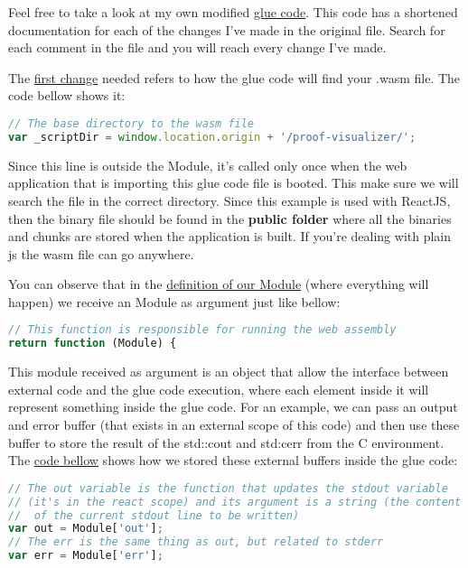 \documentclass[12pt, a4paper]{article}
\begin{document}
Feel free to take a look at my own modified \href{https://github.com/ufmg-smite/proof-visualizer/blob/main/frontend/src/wasm/cvc5.js}{glue code}. This code has a shortened documentation for each of the changes I've made in the original file. Search for each comment in the file and you will reach every change I've made.

The \href{https://github.com/ufmg-smite/proof-visualizer/blob/main/frontend/src/wasm/cvc5.js#L43}{first change} needed refers to how the glue code will find your .wasm file. The code bellow shows it:

\begin{lstlisting}[language=JavaScript]
// The base directory to the wasm file
var _scriptDir = window.location.origin + '/proof-visualizer/';
\end{lstlisting}

Since this line is outside the Module, it's called only once when the web application that is importing this glue code file is booted. This make sure we will search the file in the correct directory. Since this example is used with ReactJS, then the binary file should be found in the \textbf{public folder} where all the binaries and chunks are stored when the application is built. If you're dealing with plain js the wasm file can go anywhere.

You can observe that in the \href{https://github.com/ufmg-smite/proof-visualizer/blob/main/frontend/src/wasm/cvc5.js#L45-L46}{definition of our Module} (where everything will happen) we receive an Module as argument just like bellow:

\begin{lstlisting}[language=JavaScript]
// This function is responsible for running the web assembly
return function (Module) {
\end{lstlisting}

This module received as argument is an object that allow the interface between external code and the glue code execution, where each element inside it will represent something inside the glue code. For an example, we can pass an output and error buffer (that exists in an external scope of this code) and then use these buffer to store the result of the std::cout and std:cerr from the C environment. The \href{https://github.com/ufmg-smite/proof-visualizer/blob/main/frontend/src/wasm/cvc5.js#L116-L121}{code bellow} shows how we stored these external buffers inside the glue code: 

\begin{lstlisting}[language=JavaScript]
// The out variable is the function that updates the stdout variable
// (it's in the react scope) and its argument is a string (the content
//  of the current stdout line to be written)
var out = Module['out'];
// The err is the same thing as out, but related to stderr
var err = Module['err'];
\end{lstlisting}
\end{document}
